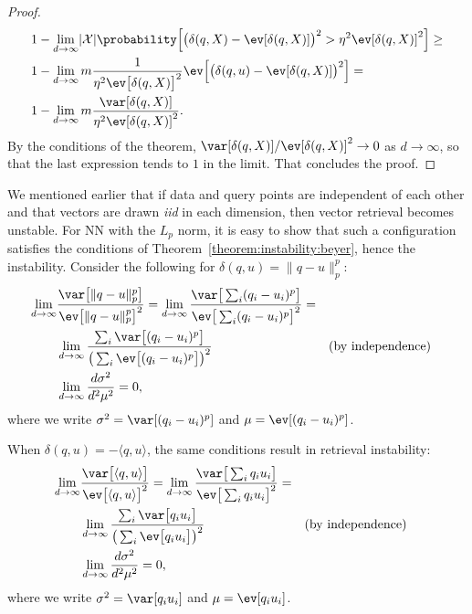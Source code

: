 \begin{proof}
\begin{align*}
        &1 - \lim_{d \rightarrow \infty} \lvert \mathcal{X} \rvert \probability\Big[\big( \delta(q, X) - \ev[\delta(q, X)] \big)^2 > \eta^2 \ev[\delta(q, X)]^2 \Big] \geq\\
        &1 - \lim_{d \rightarrow \infty} m \frac{1}{\eta^2 \ev \big[\delta(q, X)\big]^2} \ev \Big[ \big( \delta(q, u) - \ev[\delta(q, X)] \big)^2 \Big] =\\
        &1 - \lim_{d \rightarrow \infty} m \frac{\var[\delta(q, X)]}{\eta^2 \ev[\delta(q, X)]^2}.
    \end{align*}
    By the conditions of the theorem, $\var[\delta(q, X)]/\ev[\delta(q, X)]^2 \rightarrow 0$ as 
    $d \rightarrow \infty$, so that the last expression tends to $1$ in the limit. That concludes the proof.
\end{proof}

We mentioned earlier that if data and query points are independent of each other
and that vectors are drawn \emph{iid} in each dimension, then vector retrieval becomes
unstable. For NN with the $L_p$ norm, it is easy to show that such a configuration
satisfies the conditions of Theorem~\ref{theorem:instability:beyer}, hence the instability.
Consider the following for $\delta(q, u) = \lVert q - u \rVert_p^p$:
\begin{align*}
    \lim_{d \rightarrow \infty} &\frac{\var \big[ \lVert q - u \rVert_p^p \big]}{ \ev \big[ \lVert q - u \rVert_p^p \big]^2} = 
    \lim_{d \rightarrow \infty} \frac{\var \big[ \sum_i ( q_i - u_i )^p \big]}{ \ev \big[ \sum_i ( q_i - u_i )^p \big]^2} = \\
    &\lim_{d \rightarrow \infty} \frac{\sum_i \var \big[ ( q_i - u_i )^p \big]}{ \big(\sum_i \ev \big[ ( q_i - u_i )^p \big] \big)^2} && \text{(by independence)} \\
    &\lim_{d \rightarrow \infty} \frac{d \sigma^2}{d^2 \mu^2} = 0,
\end{align*}
where we write $\sigma^2 = \var[(q_i - u_i)^p]$ and $\mu = \ev[(q_i - u_i)^p]$.

When $\delta(q, u) = - \langle q, u \rangle$, the same conditions result in retrieval instability:
\begin{align*}
    \lim_{d \rightarrow \infty} &\frac{\var \big[ \langle q, u \rangle \big]}{ \ev \big[ \langle q, u \rangle \big]^2} = 
    \lim_{d \rightarrow \infty} \frac{\var \big[ \sum_i q_i u_i \big]}{ \ev \big[ \sum_i q_i u_i \big]^2} = \\
    &\lim_{d \rightarrow \infty} \frac{\sum_i \var \big[ q_i u_i \big]}{ \big(\sum_i \ev \big[ q_i u_i \big] \big)^2} && \text{(by independence)} \\
    &\lim_{d \rightarrow \infty} \frac{d \sigma^2}{d^2 \mu^2} = 0,
\end{align*}
where we write $\sigma^2 = \var[q_i u_i]$ and $\mu = \ev[q_i u_i]$.

